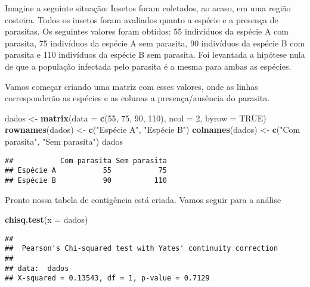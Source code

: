 \documentclass[titlepage, oneside, openany, a4paper]{book}
\newenvironment{Shaded}{\begin{snugshade}}{\end{snugshade}}
\newcommand{\DataTypeTok}[1]{\textcolor[rgb]{0.13,0.29,0.53}{#1}}
\newcommand{\DecValTok}[1]{\textcolor[rgb]{0.00,0.00,0.81}{#1}}
\newcommand{\KeywordTok}[1]{\textcolor[rgb]{0.13,0.29,0.53}{\textbf{#1}}}
\newcommand{\NormalTok}[1]{#1}
\newcommand{\OtherTok}[1]{\textcolor[rgb]{0.56,0.35,0.01}{#1}}
\newcommand{\StringTok}[1]{\textcolor[rgb]{0.31,0.60,0.02}{#1}}
\begin{document}
Imagine a seguinte situação: Insetos foram coletados, ao acaso, em uma região costeira. Todos os insetos foram avaliados quanto a espécie e a presença de parasitas. Os seguintes valores foram obtidos: 55 indivíduos da espécie A com parasita, 75 indivíduos da espécie A sem parasita, 90 indivíduos da espécie B com parasita e 110 indivíduos da espécie B sem parasita. Foi levantada a hipótese nula de que a população infectada pelo parasita é a mesma para ambas as espécies.

Vamos começar criando uma matriz com esses valores, onde as linhas corresponderão as espécies e as colunas a presença/ausência do parasita.

\begin{Shaded}
\begin{Highlighting}[]
\NormalTok{dados <-}\StringTok{ }\KeywordTok{matrix}\NormalTok{(}\DataTypeTok{data =} \KeywordTok{c}\NormalTok{(}\DecValTok{55}\NormalTok{, }\DecValTok{75}\NormalTok{, }\DecValTok{90}\NormalTok{, }\DecValTok{110}\NormalTok{), }\DataTypeTok{ncol =} \DecValTok{2}\NormalTok{, }\DataTypeTok{byrow =} \OtherTok{TRUE}\NormalTok{)}
\KeywordTok{rownames}\NormalTok{(dados) <-}\StringTok{ }\KeywordTok{c}\NormalTok{(}\StringTok{"Espécie A"}\NormalTok{, }\StringTok{"Espécie B"}\NormalTok{)}
\KeywordTok{colnames}\NormalTok{(dados) <-}\StringTok{ }\KeywordTok{c}\NormalTok{(}\StringTok{"Com parasita"}\NormalTok{, }\StringTok{"Sem parasita"}\NormalTok{)}
\NormalTok{dados}
\end{Highlighting}
\end{Shaded}

\begin{verbatim}
##           Com parasita Sem parasita
## Espécie A           55           75
## Espécie B           90          110
\end{verbatim}

Pronto nossa tabela de contigência está criada. Vamos seguir para a análise

\begin{Shaded}
\begin{Highlighting}[]
\KeywordTok{chisq.test}\NormalTok{(}\DataTypeTok{x =}\NormalTok{ dados)}
\end{Highlighting}
\end{Shaded}

\begin{verbatim}
## 
##  Pearson's Chi-squared test with Yates' continuity correction
## 
## data:  dados
## X-squared = 0.13543, df = 1, p-value = 0.7129
\end{verbatim}
\end{document}
